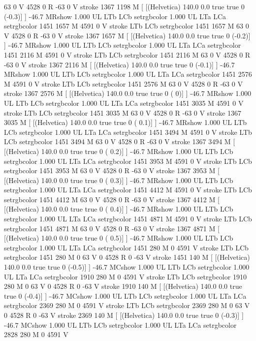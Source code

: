 63 0 V
4528 0 R
-63 0 V
stroke
1367 1198 M
[ [(Helvetica) 140.0 0.0 true true 0 (-0.3)]
] -46.7 MRshow
1.000 UL
LTb
LCb setrgbcolor
1.000 UL
LTa
LCa setrgbcolor
1451 1657 M
4591 0 V
stroke
LTb
LCb setrgbcolor
1451 1657 M
63 0 V
4528 0 R
-63 0 V
stroke
1367 1657 M
[ [(Helvetica) 140.0 0.0 true true 0 (-0.2)]
] -46.7 MRshow
1.000 UL
LTb
LCb setrgbcolor
1.000 UL
LTa
LCa setrgbcolor
1451 2116 M
4591 0 V
stroke
LTb
LCb setrgbcolor
1451 2116 M
63 0 V
4528 0 R
-63 0 V
stroke
1367 2116 M
[ [(Helvetica) 140.0 0.0 true true 0 (-0.1)]
] -46.7 MRshow
1.000 UL
LTb
LCb setrgbcolor
1.000 UL
LTa
LCa setrgbcolor
1451 2576 M
4591 0 V
stroke
LTb
LCb setrgbcolor
1451 2576 M
63 0 V
4528 0 R
-63 0 V
stroke
1367 2576 M
[ [(Helvetica) 140.0 0.0 true true 0 ( 0)]
] -46.7 MRshow
1.000 UL
LTb
LCb setrgbcolor
1.000 UL
LTa
LCa setrgbcolor
1451 3035 M
4591 0 V
stroke
LTb
LCb setrgbcolor
1451 3035 M
63 0 V
4528 0 R
-63 0 V
stroke
1367 3035 M
[ [(Helvetica) 140.0 0.0 true true 0 ( 0.1)]
] -46.7 MRshow
1.000 UL
LTb
LCb setrgbcolor
1.000 UL
LTa
LCa setrgbcolor
1451 3494 M
4591 0 V
stroke
LTb
LCb setrgbcolor
1451 3494 M
63 0 V
4528 0 R
-63 0 V
stroke
1367 3494 M
[ [(Helvetica) 140.0 0.0 true true 0 ( 0.2)]
] -46.7 MRshow
1.000 UL
LTb
LCb setrgbcolor
1.000 UL
LTa
LCa setrgbcolor
1451 3953 M
4591 0 V
stroke
LTb
LCb setrgbcolor
1451 3953 M
63 0 V
4528 0 R
-63 0 V
stroke
1367 3953 M
[ [(Helvetica) 140.0 0.0 true true 0 ( 0.3)]
] -46.7 MRshow
1.000 UL
LTb
LCb setrgbcolor
1.000 UL
LTa
LCa setrgbcolor
1451 4412 M
4591 0 V
stroke
LTb
LCb setrgbcolor
1451 4412 M
63 0 V
4528 0 R
-63 0 V
stroke
1367 4412 M
[ [(Helvetica) 140.0 0.0 true true 0 ( 0.4)]
] -46.7 MRshow
1.000 UL
LTb
LCb setrgbcolor
1.000 UL
LTa
LCa setrgbcolor
1451 4871 M
4591 0 V
stroke
LTb
LCb setrgbcolor
1451 4871 M
63 0 V
4528 0 R
-63 0 V
stroke
1367 4871 M
[ [(Helvetica) 140.0 0.0 true true 0 ( 0.5)]
] -46.7 MRshow
1.000 UL
LTb
LCb setrgbcolor
1.000 UL
LTa
LCa setrgbcolor
1451 280 M
0 4591 V
stroke
LTb
LCb setrgbcolor
1451 280 M
0 63 V
0 4528 R
0 -63 V
stroke
1451 140 M
[ [(Helvetica) 140.0 0.0 true true 0 (-0.5)]
] -46.7 MCshow
1.000 UL
LTb
LCb setrgbcolor
1.000 UL
LTa
LCa setrgbcolor
1910 280 M
0 4591 V
stroke
LTb
LCb setrgbcolor
1910 280 M
0 63 V
0 4528 R
0 -63 V
stroke
1910 140 M
[ [(Helvetica) 140.0 0.0 true true 0 (-0.4)]
] -46.7 MCshow
1.000 UL
LTb
LCb setrgbcolor
1.000 UL
LTa
LCa setrgbcolor
2369 280 M
0 4591 V
stroke
LTb
LCb setrgbcolor
2369 280 M
0 63 V
0 4528 R
0 -63 V
stroke
2369 140 M
[ [(Helvetica) 140.0 0.0 true true 0 (-0.3)]
] -46.7 MCshow
1.000 UL
LTb
LCb setrgbcolor
1.000 UL
LTa
LCa setrgbcolor
2828 280 M
0 4591 V
